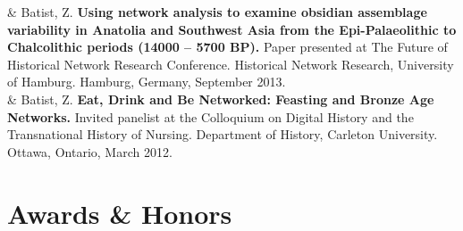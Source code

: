 \documentclass[11pt, a4paper]{article}
\newcommand{\LastName}{Batist}
\newcommand{\Initials}{Z}
\newcommand{\Me}{\LastName, \Initials}  %
\newcommand{\Year}[1]{\fontsize{10pt}{0}\selectfont #1}
\begin{document}
\begin{EntriesTable}
  \Year{2013}  &
  \Me.
  \textbf{Using network analysis to examine obsidian assemblage variability in Anatolia and Southwest Asia from the Epi-Palaeolithic to Chalcolithic periods (14000 – 5700 BP).}
  Paper presented at The Future of Historical Network Research Conference. Historical Network Research, University of Hamburg. Hamburg, Germany, September 2013.
  \\

  \Year{2012}  &
  \Me.
  \textbf{Eat, Drink and Be Networked: Feasting and Bronze Age Networks.}
  Invited panelist at the Colloquium on Digital History and the Transnational History of Nursing. Department of History, Carleton University. Ottawa, Ontario, March 2012.
  \\

\end{EntriesTable}


\section{Awards \& Honors}
\end{document}
